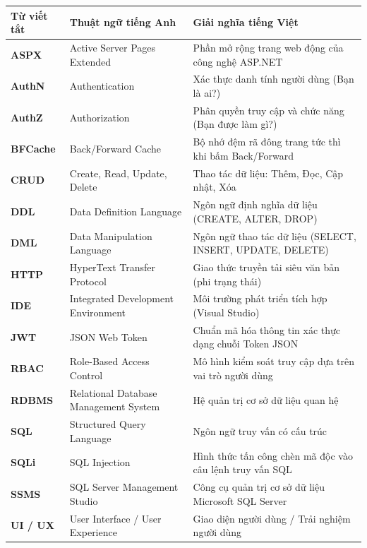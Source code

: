 \documentclass[12pt,a4paper]{report}
\begin{document}
\begin{center}
\small
\renewcommand{\arraystretch}{1.05}
\begin{tabularx}{\textwidth}{>{\raggedright\arraybackslash}p{2.3cm} >{\raggedright\arraybackslash}p{4.5cm} >{\raggedright\arraybackslash}X}
\toprule
\textbf{Từ viết tắt} & \textbf{Thuật ngữ tiếng Anh} & \textbf{Giải nghĩa tiếng Việt} \\
\midrule
\textbf{ASPX} & Active Server Pages Extended & Phần mở rộng trang web động của công nghệ ASP.NET \\
\textbf{AuthN} & Authentication & Xác thực danh tính người dùng (Bạn là ai?) \\
\textbf{AuthZ} & Authorization & Phân quyền truy cập và chức năng (Bạn được làm gì?) \\
\textbf{BFCache} & Back/Forward Cache & Bộ nhớ đệm rã đông trang tức thì khi bấm Back/Forward \\
\textbf{CRUD} & Create, Read, Update, Delete & Thao tác dữ liệu: Thêm, Đọc, Cập nhật, Xóa \\
\textbf{DDL} & Data Definition Language & Ngôn ngữ định nghĩa dữ liệu (CREATE, ALTER, DROP) \\
\textbf{DML} & Data Manipulation Language & Ngôn ngữ thao tác dữ liệu (SELECT, INSERT, UPDATE, DELETE) \\
\textbf{HTTP} & HyperText Transfer Protocol & Giao thức truyền tải siêu văn bản (phi trạng thái) \\
\textbf{IDE} & Integrated Development Environment & Môi trường phát triển tích hợp (Visual Studio) \\
\textbf{JWT} & JSON Web Token & Chuẩn mã hóa thông tin xác thực dạng chuỗi Token JSON \\
\textbf{RBAC} & Role-Based Access Control & Mô hình kiểm soát truy cập dựa trên vai trò người dùng \\
\textbf{RDBMS} & Relational Database Management System & Hệ quản trị cơ sở dữ liệu quan hệ \\
\textbf{SQL} & Structured Query Language & Ngôn ngữ truy vấn có cấu trúc \\
\textbf{SQLi} & SQL Injection & Hình thức tấn công chèn mã độc vào câu lệnh truy vấn SQL \\
\textbf{SSMS} & SQL Server Management Studio & Công cụ quản trị cơ sở dữ liệu Microsoft SQL Server \\
\textbf{UI / UX} & User Interface / User Experience & Giao diện người dùng / Trải nghiệm người dùng \\
\bottomrule
\end{tabularx}
\end{center}
\newpage
\end{document}
